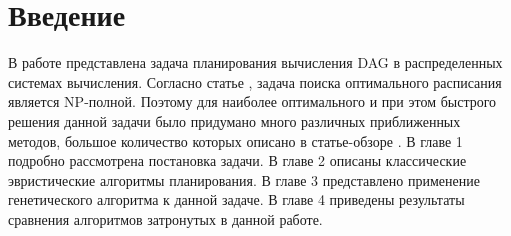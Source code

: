 \chapter*{Введение}




\begin{spacing}{1.3}
В работе представлена задача планирования вычисления DAG в распределенных системах вычисления. Согласно статье \cite{NPCOMP}, задача поиска оптимального расписания является NP-полной. Поэтому для наиболее оптимального и при этом быстрого решения данной задачи было придумано много различных приближенных методов, большое количество которых описано в статье-обзоре \cite{NZOV}.  В главе 1 подробно рассмотрена постановка задачи. В главе 2 описаны классические эвристические алгоритмы планирования. В главе 3 представлено применение генетического алгоритма к данной задаче. В главе 4 приведены результаты сравнения алгоритмов затронутых в данной работе.
 
\end{spacing}

